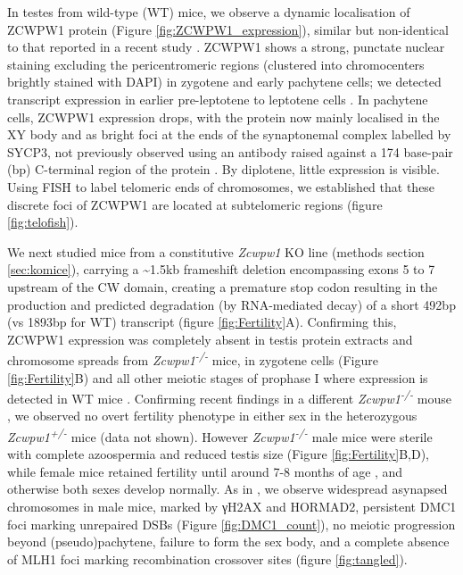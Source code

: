 In testes from wild-type (WT) mice, we observe a dynamic localisation of ZCWPW1 protein (Figure \ref{fig:ZCWPW1_expression}), similar but non-identical to that reported in a recent study \parencite{Li2019histone}.
ZCWPW1 shows a strong, punctate nuclear staining excluding the pericentromeric regions (clustered into chromocenters brightly stained with DAPI) in zygotene and early pachytene cells; we detected transcript expression in earlier pre-leptotene to leptotene cells \parencite{Jung2019Unified}.
In pachytene cells, ZCWPW1 expression drops, with the protein now mainly localised in the XY body and as bright foci at the ends of the synaptonemal complex labelled by SYCP3, not previously observed using an antibody raised against a 174 base-pair (bp) C-terminal region of the protein \parencite{Li2019histone}.
By diplotene, little expression is visible.
Using FISH to label telomeric ends of chromosomes, we established that these discrete foci of ZCWPW1 are located at subtelomeric regions (figure \ref{fig:telofish}).

We next studied mice from a constitutive \textit{Zcwpw1} KO line (methods section \ref{sec:komice}), carrying a \textasciitilde1.5kb frameshift deletion encompassing exons 5 to 7 upstream of the CW domain, creating a premature stop codon resulting in the production and predicted degradation (by RNA-mediated decay) of a short 492bp (vs 1893bp for WT) transcript (figure \ref{fig:Fertility}A).
Confirming this, ZCWPW1 expression was completely absent in testis protein extracts \iffalse supp fig \fi and chromosome spreads from \textit{Zcwpw1\textsuperscript{-/-}} mice, in zygotene cells (Figure \ref{fig:Fertility}B) and all other meiotic stages of prophase I where expression is detected in WT mice \iffalse supp fig \fi.
Confirming recent findings in a different \textit{Zcwpw1\textsuperscript{-/-}} mouse \parencite{Li2019histone}, we observed no overt fertility phenotype in either sex in the heterozygous \textit{Zcwpw1\textsuperscript{+/-}} mice (data not shown).
However \textit{Zcwpw1\textsuperscript{-/-}} male mice were sterile with complete azoospermia and reduced testis size (Figure \ref{fig:Fertility}B,D), while female mice retained fertility until around 7-8 months of age \iffalse supp table \fi, and otherwise both sexes develop normally.
As in \cite{Li2019histone}, we observe widespread asynapsed chromosomes in male mice, marked by γH2AX and HORMAD2, persistent DMC1 foci marking unrepaired DSBs (Figure \ref{fig:DMC1_count}), no meiotic progression beyond (pseudo)pachytene, failure to form the sex body, and a complete absence of MLH1 foci marking recombination crossover sites (figure \ref{fig:tangled}).

